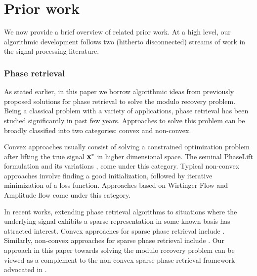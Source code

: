 \section{Prior work}
\label{sec:prior}

We now provide a brief overview of related prior work. At a high level, our algorithmic development follows two (hitherto disconnected) streams of work in the signal processing literature.

\subsubsection*{Phase retrieval} As stated earlier, in this paper we borrow algorithmic ideas from previously proposed solutions for phase retrieval to solve the modulo recovery problem. Being a classical problem with a variety of applications, phase retrieval has been studied significantly in past few years. Approaches to solve this problem can be broadly classified into two categories: convex and non-convex. 

Convex approaches usually consist of solving a constrained optimization problem after lifting the true signal $\mathbf{x^*}$ in higher dimensional space. The seminal PhaseLift formulation \cite{candes2013phaselift} and its variations \cite{gross2017improved}, \cite{candes2015phasediff} come under this category. Typical non-convex approaches involve finding a good initialization, followed by iterative minimization of a loss function. Approaches based on Wirtinger Flow \cite{candes2015phase, zhang2016reshaped,  chen2015solving, cai2016optimal} and Amplitude flow \cite{wang2016sparse,wang2016solving} come under this category. 

In recent works, extending phase retrieval algorithms to situations where the underlying signal exhibits a sparse representation in some known basis has attracted interest. Convex approaches for sparse phase retrieval include \cite{ohlsson2012cprl, li2013sparse,bahmani2015efficient,jaganathan2012recovery}. Similarly, non-convex approaches for sparse phase retrieval include \cite{netrapalli2013phase, cai2016optimal, wang2016sparse}. Our approach in this paper towards solving the modulo recovery problem can be viewed as a complement to the non-convex sparse phase retrieval framework advocated in \cite{Jagatap2017}. 


